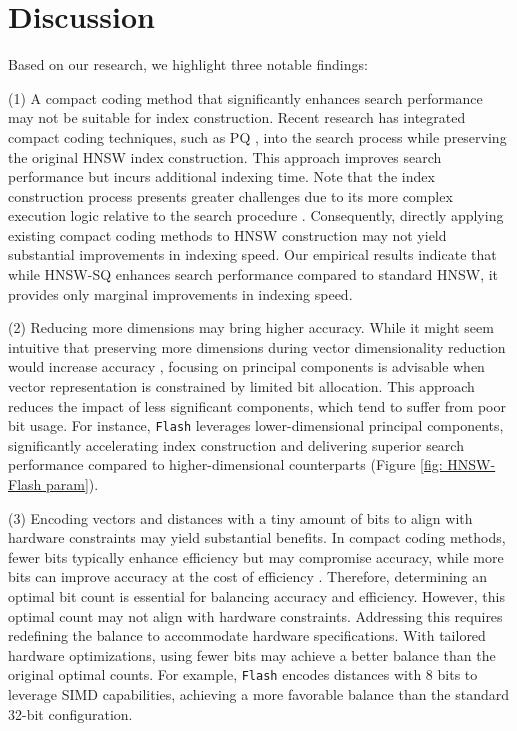 \section{Discussion}
\label{sec: summary}
Based on our research, we highlight three notable findings:

(1) \textsf{A compact coding method that significantly enhances search performance may not be suitable for index construction.} Recent research \cite{DiskANN,yue2023routing,HVS,yang2024bridging} has integrated compact coding techniques, such as PQ \cite{PQ}, into the search process while preserving the original HNSW index construction. This approach improves search performance but incurs additional indexing time. Note that the index construction process presents greater challenges due to its more complex execution logic relative to the search procedure \cite{HNSW,graph_survey_vldb2021}. Consequently, directly applying existing compact coding methods to HNSW construction may not yield substantial improvements in indexing speed. Our empirical results indicate that while HNSW-SQ enhances search performance compared to standard HNSW, it provides only marginal improvements in indexing speed.


(2) \textsf{Reducing more dimensions may bring higher accuracy.} While it might seem intuitive that preserving more dimensions during vector dimensionality reduction would increase accuracy \cite{ADSampling,tau-MG,yang2024bridging}, focusing on principal components is advisable when vector representation is constrained by limited bit allocation. This approach reduces the impact of less significant components, which tend to suffer from poor bit usage. For instance, \texttt{Flash} leverages lower-dimensional principal components, significantly accelerating index construction and delivering superior search performance compared to higher-dimensional counterparts (Figure \ref{fig: HNSW-Flash param}).

(3) \textsf{Encoding vectors and distances with a tiny amount of bits to align with hardware constraints may yield substantial benefits.} In compact coding methods, fewer bits typically enhance efficiency but may compromise accuracy, while more bits can improve accuracy at the cost of efficiency \cite{PQ,OPQ}. Therefore, determining an optimal bit count is essential for balancing accuracy and efficiency. However, this optimal count may not align with hardware constraints. Addressing this requires redefining the balance to accommodate hardware specifications. With tailored hardware optimizations, using fewer bits may achieve a better balance than the original optimal counts. For example, \texttt{Flash} encodes distances with 8 bits to leverage SIMD capabilities, achieving a more favorable balance than the standard 32-bit configuration.





